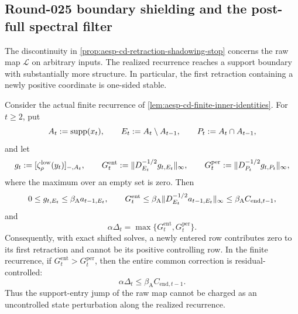 \subsection{Round-025 boundary shielding and the post-full spectral filter}

The discontinuity in
\cref{prop:aesp-cd-retraction-shadowing-stop} concerns the raw map
$\mathcal L$ on arbitrary inputs.  The realized recurrence reaches a support
boundary with substantially more structure.  In particular, the first
retraction containing a newly positive coordinate is one-sided stable.

\begin{lemma}
\label{lem:aesp-cd-support-entry-shield}
Consider the actual finite recurrence of
\cref{lem:aesp-cd-finite-inner-identities}.  For $t\geq2$, put
\begin{equation*}
 A_t:=\operatorname{supp}(x_t),\qquad
 E_t:=A_t\setminus A_{t-1},\qquad
 P_t:=A_t\cap A_{t-1},
\end{equation*}
and let
\begin{equation*}
 g_t:=[\zeta_\rho^{\mathrm{low}}(y_t)]_{-,A_t},\qquad
 G_t^{\mathrm{ent}}
 :=\lVert D_{E_t}^{-1/2}g_{t,E_t}\rVert_\infty,
 \qquad
 G_t^{\mathrm{per}}
 :=\lVert D_{P_t}^{-1/2}g_{t,P_t}\rVert_\infty,
\end{equation*}
where the maximum over an empty set is zero.  Then
\begin{equation}
 0\leq g_{t,E_t}\leq\beta_{\mathrm A}a_{t-1,E_t},
 \qquad
 G_t^{\mathrm{ent}}
 \leq\beta_{\mathrm A}
       \lVert D_{E_t}^{-1/2}a_{t-1,E_t}\rVert_\infty
 \leq\beta_{\mathrm A}C_{\mathrm{end},t-1},
 \label{eq:aesp-cd-support-entry-residual-bound}
\end{equation}
and
\begin{equation}
 \alpha\Delta_t=\max\{G_t^{\mathrm{ent}},G_t^{\mathrm{per}}\}.
 \label{eq:aesp-cd-entry-persistent-split}
\end{equation}
Consequently, with exact shifted solves, a newly entered row contributes
zero to its first retraction and cannot be its positive controlling row.  In
the finite recurrence, if
$G_t^{\mathrm{ent}}>G_t^{\mathrm{per}}$, then the entire common correction
is residual-controlled:
\begin{equation}
 \alpha\Delta_t\leq
 \beta_{\mathrm A}C_{\mathrm{end},t-1}.
 \label{eq:aesp-cd-entry-dominant-delta}
\end{equation}
Thus the support-entry jump of the raw map cannot be charged as an
uncontrolled state perturbation along the realized recurrence.
\end{lemma}

